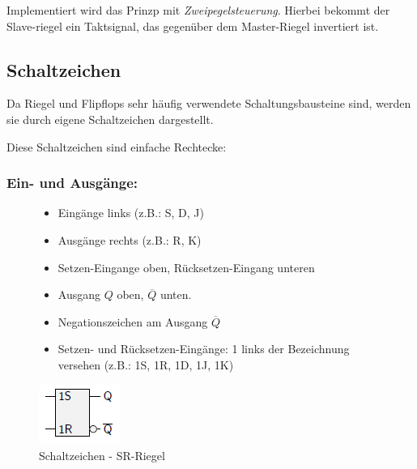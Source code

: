 \documentclass[12pt]{report}
\begin{document}
Implementiert wird das Prinzp mit \textit{Zweipegelsteuerung}. Hierbei bekommt der Slave-riegel
ein Taktsignal, das gegenüber dem Master-Riegel invertiert ist.

\subsection{Schaltzeichen}
Da Riegel und Flipflops sehr häufig verwendete Schaltungsbausteine sind, werden sie durch eigene Schaltzeichen dargestellt.

Diese Schaltzeichen sind einfache Rechtecke:

\subsubsection{Ein- und Ausgänge:}
\begin{figure}[H]
  \begin{minipage}[t]{0.45\textwidth}
    \begin{itemize}
      \item Eingänge links (z.B.: S, D, J)
      \item Ausgänge rechts (z.B.: R, K)
      \item Setzen-Eingange oben, Rücksetzen-Eingang unteren
      \item Ausgang $Q$ oben, $\overline{Q}$ unten.
      \item Negationszeichen am Ausgang $\overline{Q}$
      \item Setzen- und Rücksetzen-Eingänge: 1 links der Bezeichnung versehen (z.B.: 1S, 1R, 1D, 1J, 1K)
    \end{itemize}
  \end{minipage}
  \hfill
  \begin{minipage}[t]{0.45\textwidth}
    \caption{Schaltzeichen - SR-Riegel}
    \centering
    \includegraphics[scale=1.2]{schaltzeichen}
  \end{minipage}
\end{figure}
\end{document}
